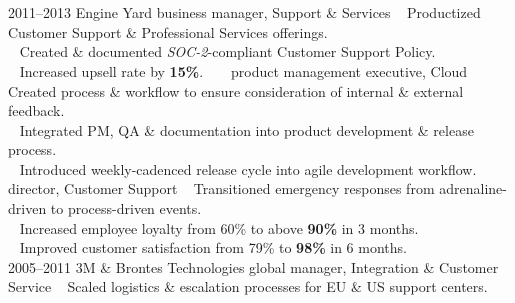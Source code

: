 \documentclass[]{friggeri-cv} %
\begin{document}

\section{{}{} {\normalsize{} ~~ }}

\begin{entrylist}
\entry
{2011--2013}
{Engine Yard}
{business manager, Support \& Services}
{{\tiny {}} ~ Productized Customer Support \& Professional Services offerings.\\
{\tiny {}} ~ Created \& documented \emph{SOC-2}-compliant Customer Support Policy.
\\{\tiny {}} ~ Increased upsell rate by \textbf{15\%}.}
\entry
{~}
{~}
{product management executive, Cloud}
{{\tiny {}} ~ Created process \& workflow to ensure consideration of internal \& external feedback.\\
{\tiny {}} ~ Integrated PM, QA \& documentation into product development \& release process.\\
{\tiny {}} ~  Introduced weekly-cadenced release cycle into agile development workflow.}
\entry
{~}
{~}
{director, Customer Support}
{{\tiny {}} ~ Transitioned emergency responses from adrenaline-driven to process-driven events.\\
{\tiny {}} ~ Increased employee loyalty from 60\% to above \textbf{90\%} in 3 months.\\
{\tiny {}} ~ Improved customer satisfaction from 79\% to \textbf{98\%} in 6 months.\\
}
\entry
{2005--2011}
{3M \& Brontes Technologies}
{global manager, Integration \& Customer Service}
{{\tiny {}} ~ Scaled logistics \& escalation processes for EU \& US support centers.\\
}
\end{entrylist}
\end{document}
